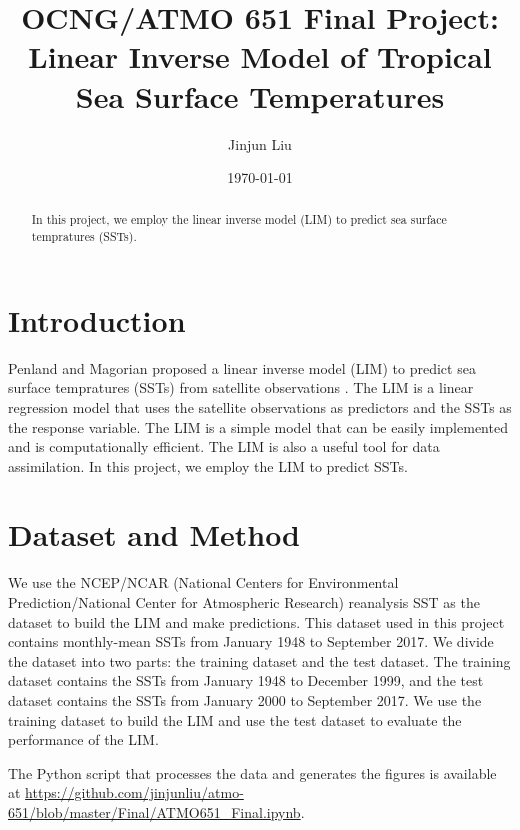 \documentclass[12pt,a4paper]{article}
\title{OCNG/ATMO 651 Final Project: Linear Inverse Model of Tropical Sea Surface Temperatures}
\author{Jinjun Liu}
\date{\today}
\begin{document}
\maketitle
\thispagestyle{empty}
\begin{abstract}

In this project, we employ the linear inverse model (LIM) to predict sea surface tempratures (SSTs).

\end{abstract}

\tableofcontents

\clearpage %

\section{Introduction} %

Penland and Magorian proposed a linear inverse model (LIM) to predict sea surface tempratures (SSTs) from satellite observations \cite{Penland1993}. The LIM is a linear regression model that uses the satellite observations as predictors and the SSTs as the response variable. The LIM is a simple model that can be easily implemented and is computationally efficient. The LIM is also a useful tool for data assimilation. In this project, we employ the LIM to predict SSTs.

\section{Dataset and Method}\label{dataset-method}

We use the NCEP/NCAR (National Centers for Environmental Prediction/National Center for Atmospheric Research) reanalysis SST as the dataset to build the LIM and make predictions. This dataset used in this project contains monthly-mean SSTs from January 1948 to September 2017. We divide the dataset into two parts: the training dataset and the test dataset. The training dataset contains the SSTs from January 1948 to December 1999, and the test dataset contains the SSTs from January 2000 to September 2017. We use the training dataset to build the LIM and use the test dataset to evaluate the performance of the LIM.

The Python script that processes the data and generates the figures is available at \url{https://github.com/jinjunliu/atmo-651/blob/master/Final/ATMO651\_Final.ipynb}.
\end{document}
